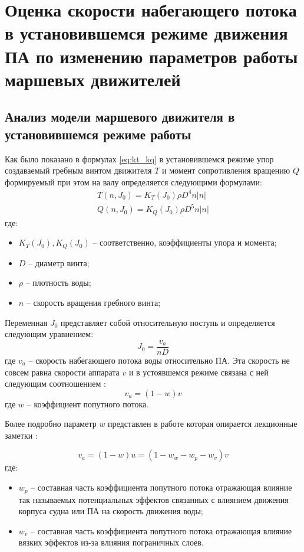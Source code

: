 \chapter{Оценка скорости набегающего потока в установившемся режиме движения ПА по изменению параметров работы маршевых движителей}\label{ch:Velocity}

\section{Анализ модели маршевого движителя в установившемся режиме работы}
Как было показано в формулах \ref{eq:kt_kq} в установившемся режиме упор создаваемый гребным винтом движителя $T$ и момент сопротивления вращению $Q$ формируемый при этом на валу определяется следующими формулами:
\begin{gather*}
    T(n, J_0) = K_T (J_0) \rho D^4 n |n|\\
    Q(n, J_0) = K_Q (J_0) \rho D^5 n |n|
\end{gather*}
\noindent где:
\begin{itemize}
    \item $K_T (J_0), K_Q (J_0)$ -- соответственно, коэффициенты упора и момента;
    \item $D$ -- диаметр винта;
    \item $\rho$ -- плотность воды;
    \item $n$ -- скорость вращения гребного винта;
\end{itemize}

Переменная $J_0$ представляет собой относительную поступь и определяется следующим уравнением:
\begin{equation}
    \label{eq:ratio_1}
    J_0 = \frac{v_a}{nD}
\end{equation}
\noindent где $v_a$ -- скорость набегающего потока воды относительно ПА.
Эта скорость не совсем равна скорости аппарата $v$ и в устоявшемся режиме связана с ней следующим соотношением \cite{lewis1988principles}:
\begin{equation*}
    v_a = (1-w)v
\end{equation*}
\noindent где $w$ -- коэффициент попутного потока.

Более подробно параметр $w$ представлен в работе \cite{10.1016/s1474-6670-17-46514-1} которая опирается лекционные заметки \cite{walderhaug1992motstand}:

\begin{equation*}
    \label{eq:ambient_flow}
    v_a = (1-w)u = (1 - w_w - w_p - w_v)v
\end{equation*}
\noindent где:
\begin{itemize}
    \item $w_p$ -- составная часть коэффициента попутного потока отражающая влияние так называемых потенциальных эффектов связанных с влиянием движения корпуса судна или ПА на скорость движения воды;
    \item $w_v$ -- составная часть коэффициента попутного потока отражающая влияние вязких эффектов из-за влияния пограничных слоев.
\end{itemize}

